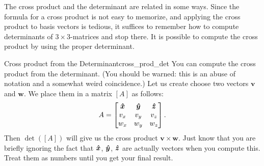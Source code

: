         The cross product and the determinant are related in some ways.  Since the formula for a cross product is not easy to memorize, and applying the cross product to basis vectors is tedious, it suffices to remember how to compute determinants of $3\times 3$-matrices and stop there. It is possible to compute the cross product by using the proper determinant. 
        
        \begin{ex}{Cross product from the Determinant}{cross_prod_det}
        You can compute the cross product from the determinant.  (You should be warned: this is an abuse of notation and a somewhat weird coincidence.) Let us create choose two vectors $\mathbf{v}$ and $\mathbf{w}$. We place them in a matrix $[A]$ as follows:
        \[
        A=
        \begin{bmatrix}
        \boldsymbol{\hat{x}} & \boldsymbol{\hat{y}} & \boldsymbol{\hat{z}}\\
        v_x & v_y & v_z\\
        w_x & w_y & w_z
        \end{bmatrix}.
        \]
        Then $\det([A])$ will give us the cross product $\mathbf{v}\times \mathbf{w}$.  Just know that you are briefly ignoring the fact that $\boldsymbol{\hat{x}}$, $\boldsymbol{\hat{y}}$, $\boldsymbol{\hat{z}}$ are actually vectors when you compute this.  Treat them as numbers until you get your final result.
        \end{ex}
        
        
